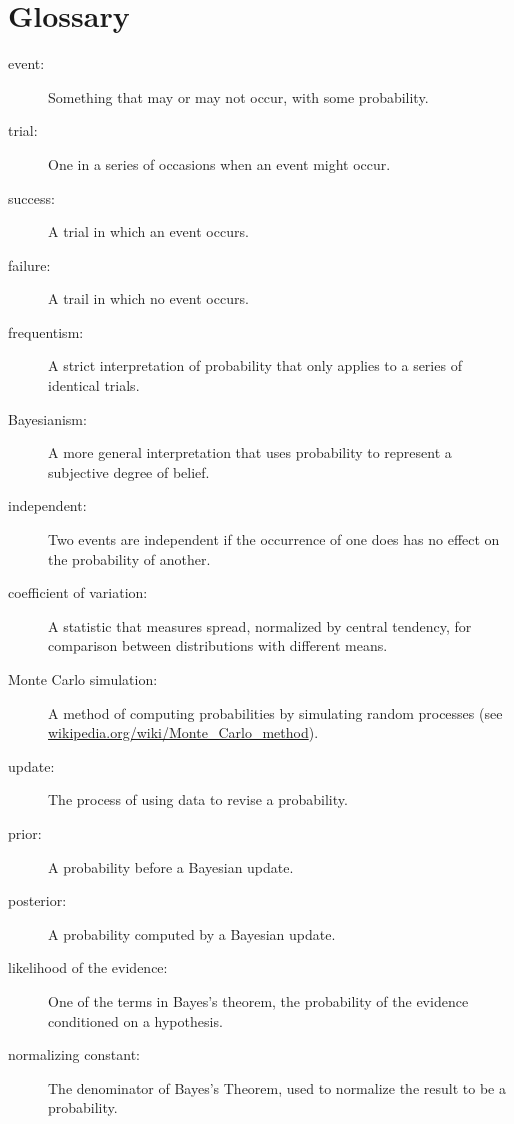 \documentclass[12pt]{book}
\begin{document}
\section{Glossary}

\begin{description}

\item[event:] Something that may or may not occur, with some probability.

\item[trial:] One in a series of occasions when an event might occur.

\item[success:] A trial in which an event occurs.

\item[failure:] A trail in which no event occurs.

\item[frequentism:] A strict interpretation of probability that only
applies to a series of identical trials.

\item[Bayesianism:] A more general interpretation that uses
probability to represent a subjective degree of belief.

\item[independent:] Two events are independent if the occurrence of
one does has no effect on the probability of another.

\item[coefficient of variation:] A statistic that measures spread,
normalized by central tendency, for comparison between distributions
with different means.

\item[Monte Carlo simulation:] A method of computing probabilities by
  simulating random processes (see
  \url{wikipedia.org/wiki/Monte_Carlo_method}).

\item[update:] The process of using data to revise a probability.

\item[prior:] A probability before a Bayesian update.

\item[posterior:] A probability computed by a Bayesian update.

\item[likelihood of the evidence:] One of the terms in Bayes's
  theorem, the probability of the evidence conditioned on a
  hypothesis.

\item[normalizing constant:] The denominator of Bayes's Theorem,
  used to normalize the result to be a probability.

\end{description}
\end{document}
